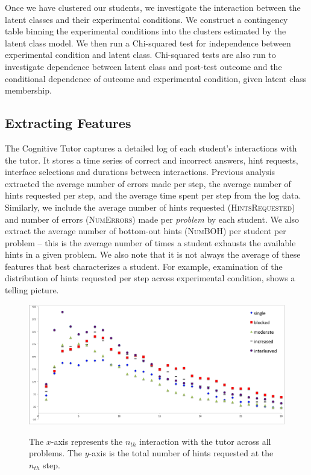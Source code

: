 \documentclass{edm_template}
\newcommand{\ftr}[1]{\textsc{#1}}
\begin{document}
Once we have clustered our students, we investigate the interaction between the latent classes and their experimental conditions. We construct a contingency table binning the experimental conditions into the clusters estimated by the latent class model. We then run a Chi-squared test for independence between experimental condition and latent class. Chi-squared tests are also run to investigate dependence between latent class and post-test outcome and the conditional dependence of outcome and experimental condition, given latent class membership.

\subsection{Extracting Features}
The Cognitive Tutor captures a detailed log of each student's interactions with the tutor. It stores a time series of correct and incorrect answers, hint requests, interface selections and durations between interactions. Previous analysis \cite{Rau2012} extracted the average number of errors made per step, the average number of hints requested per step, and the average time spent per step from the log data. Similarly, we include the average number of hints requested (\ftr{HintsRequested}) and number of errors (\ftr{NumErrors}) made per \emph{problem} by each student. We also extract the average number of bottom-out hints (\ftr{NumBOH}) per student per problem -- this is the average number of times a student exhausts the available hints in a given problem. We also note that it is not always the average of these features that best characterizes a student. For example, examination of the distribution of hints requested per step across experimental condition, shows a telling picture. 
\begin{figure}[htbp]
\centering
\includegraphics[scale=.48]{hintsByStep2.png}\\
\caption{The $x$-axis represents the $n_{th}$ interaction with the tutor across all problems. The $y$-axis is the total number of hints requested at the $n_{th}$ step.  }
\label{fig:condition-graph}
\end{figure}
\end{document}
